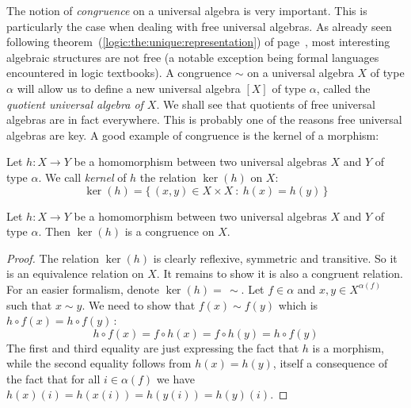 The notion of {\em congruence} on a universal algebra is very
important. This is particularly the case when dealing with free
universal algebras. As already seen following
theorem~(\ref{logic:the:unique:representation}) of
page~\pageref{logic:the:unique:representation}, most interesting
algebraic structures are not free (a notable exception being formal
languages encountered in logic textbooks). A congruence $\sim$ on a
universal algebra $X$ of type $\alpha$ will allow us to define a new
universal algebra $[X]$ of type $\alpha$, called the {\em quotient
universal algebra of $X$}. We shall see that quotients of free
universal algebras are in fact everywhere. This is probably one of
the reasons free universal algebras are key. A good example of
congruence is the kernel of a morphism:
\begin{defin}\label{logic:def:UA:congruence:kernel}
Let $h:X\to Y$ be a homomorphism between two universal algebras $X$
and $Y$ of type $\alpha$. We call {\em kernel} of $h$ the relation
$\ker(h)$ on $X$:
    \[
    \ker(h)=\{\,(x,y)\in X\times X\ :\ h(x)=h(y)\,\}
    \]
\end{defin}
\begin{prop}\label{logic:prop:UA:congruence:kernel}
Let $h:X\to Y$ be a homomorphism between two universal algebras $X$
and $Y$ of type $\alpha$. Then $\ker(h)$ is a congruence on $X$.
\end{prop}
\begin{proof}
The relation $\ker(h)$ is clearly reflexive, symmetric and
transitive. So it is an equivalence relation on $X$. It remains to
show it is also a congruent relation. For an easier formalism,
denote $\ker(h)=\,\sim$. Let $f\in\alpha$ and $x,y\in X^{\alpha(f)}$
such that $x\sim y$. We need to show that $f(x)\sim f(y)$ which is
$h\circ f(x)=h\circ f(y)$\,:
    \[
    h\circ f(x)=f\circ h(x)=f\circ h(y)=h\circ f(y)
    \]
The first and third equality are just expressing the fact that $h$
is a morphism, while the second equality follows from $h(x)=h(y)$,
itself a consequence of the fact that for all $i\in\alpha(f)$ we
have $h(x)(i)=h(x(i))=h(y(i))=h(y)(i)$.
\end{proof}
